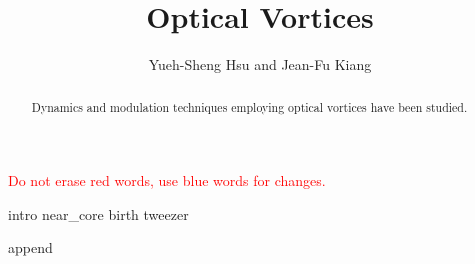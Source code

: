 \documentclass[journal]{IEEEtran}
\begin{document}
%

\title{Optical Vortices} \label{I}

\author{Yueh-Sheng Hsu and Jean-Fu Kiang
}


\maketitle 


\begin{abstract}
Dynamics and modulation techniques employing optical vortices have been studied.
\end{abstract}

\textcolor{red}{Do not erase red words, use blue words for changes.}

{intro}
{near_core}
{birth}
{tweezer}

\nocite{*}



{append}
\end{document}
